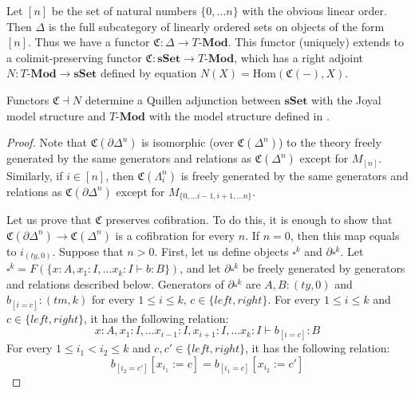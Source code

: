 \documentclass[reqno]{amsart}
\theoremstyle{definition}
\theoremstyle{remark}
\newcommand{\repl}{:=}
\newcommand{\cat}[1]{\mathbf{#1}}
\newcommand{\Mod}[1]{#1\text{-}\cat{Mod}}
\newcommand{\sSet}{\cat{sSet}}
\newcommand{\Hom}{\mathrm{Hom}}
\numberwithin{figure}{section}
\begin{document}
Let $[n]$ be the set of natural numbers $\{ 0, \ldots n \}$ with the obvious linear order.
Then $\Delta$ is the full subcategory of linearly ordered sets on objects of the form $[n]$.
Thus we have a functor $\mathfrak{C} : \Delta \to \Mod{T}$.
This functor (uniquely) extends to a colimit-preserving functor $\mathfrak{C} : \sSet \to \Mod{T}$,
which has a right adjoint $N : \Mod{T} \to \sSet$ defined by equation $N(X) = \Hom(\mathfrak{C}(-),X)$.

\begin{prop}
Functors $\mathfrak{C} \dashv N$ determine a Quillen adjunction between $\sSet$ with the Joyal model structure and $\Mod{T}$ with the model structure defined in \cite{alg-models}.
\end{prop}
\begin{proof}
Note that $\mathfrak{C}(\partial \Delta^n)$ is isomorphic (over $\mathfrak{C}(\Delta^n)$) to the theory
freely generated by the same generators and relations as $\mathfrak{C}(\Delta^n)$ except for $M_{[n]}$.
Similarly, if $i \in [n]$, then $\mathfrak{C}(\Lambda^n_i)$ is freely generated by the same generators
and relations as $\mathfrak{C}(\partial \Delta^n)$ except for $M_{\{ 0, \ldots i-1, i+1, \ldots n \}}$.

Let us prove that $\mathfrak{C}$ preserves cofibration.
To do this, it is enough to show that $\mathfrak{C}(\partial \Delta^n) \to \mathfrak{C}(\Delta^n)$ is a cofibration for every $n$.
If $n = 0$, then this map equals to $i_{(ty,0)}$.
Suppose that $n > 0$.
First, let us define objects $\square^k$ and $\partial \square^k$.
Let $\square^k = F(\{ x : A, x_1 : I, \ldots x_k : I \vdash b : B \})$,
and let $\partial \square^k$ be freely generated by generators and relations described below.
Generators of $\partial \square^k$ are $A,B : (ty,0)$ and $b_{[i=c]} : (tm,k)$ for every $1 \leq i \leq k$, $c \in \{left,right\}$.
For every $1 \leq i \leq k$ and $c \in \{left,right\}$, it has the following relation:
\[ x : A, x_1 : I, \ldots x_{i-1} : I, x_{i+1} : I, \ldots x_k : I \vdash b_{[i=c]} : B \]
For every $1 \leq i_1 < i_2 \leq k$ and $c,c' \in \{left,right\}$, it has the following relation:
\[ b_{[i_2=c']}[x_{i_1} \repl c] = b_{[i_1=c]}[x_{i_2} \repl c'] \]


\end{proof}
\end{document}
